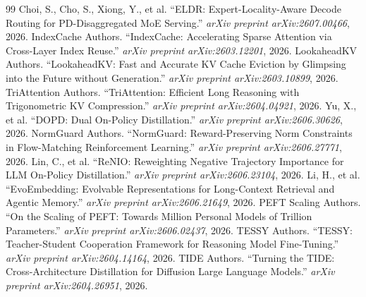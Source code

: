 \documentclass[11pt,a4paper]{article}
\begin{document}
\begin{thebibliography}{99}
 Choi, S., Cho, S., Xiong, Y., et al. ``ELDR: Expert-Locality-Aware Decode Routing for PD-Disaggregated MoE Serving.'' \emph{arXiv preprint arXiv:2607.00466}, 2026.
 IndexCache Authors. ``IndexCache: Accelerating Sparse Attention via Cross-Layer Index Reuse.'' \emph{arXiv preprint arXiv:2603.12201}, 2026.
 LookaheadKV Authors. ``LookaheadKV: Fast and Accurate KV Cache Eviction by Glimpsing into the Future without Generation.'' \emph{arXiv preprint arXiv:2603.10899}, 2026.
 TriAttention Authors. ``TriAttention: Efficient Long Reasoning with Trigonometric KV Compression.'' \emph{arXiv preprint arXiv:2604.04921}, 2026.
 Yu, X., et al. ``DOPD: Dual On-Policy Distillation.'' \emph{arXiv preprint arXiv:2606.30626}, 2026.
 NormGuard Authors. ``NormGuard: Reward-Preserving Norm Constraints in Flow-Matching Reinforcement Learning.'' \emph{arXiv preprint arXiv:2606.27771}, 2026.
 Lin, C., et al. ``ReNIO: Reweighting Negative Trajectory Importance for LLM On-Policy Distillation.'' \emph{arXiv preprint arXiv:2606.23104}, 2026.
 Li, H., et al. ``EvoEmbedding: Evolvable Representations for Long-Context Retrieval and Agentic Memory.'' \emph{arXiv preprint arXiv:2606.21649}, 2026.
 PEFT Scaling Authors. ``On the Scaling of PEFT: Towards Million Personal Models of Trillion Parameters.'' \emph{arXiv preprint arXiv:2606.02437}, 2026.
 TESSY Authors. ``TESSY: Teacher-Student Cooperation Framework for Reasoning Model Fine-Tuning.'' \emph{arXiv preprint arXiv:2604.14164}, 2026.
 TIDE Authors. ``Turning the TIDE: Cross-Architecture Distillation for Diffusion Large Language Models.'' \emph{arXiv preprint arXiv:2604.26951}, 2026.
\end{thebibliography}
\end{document}
